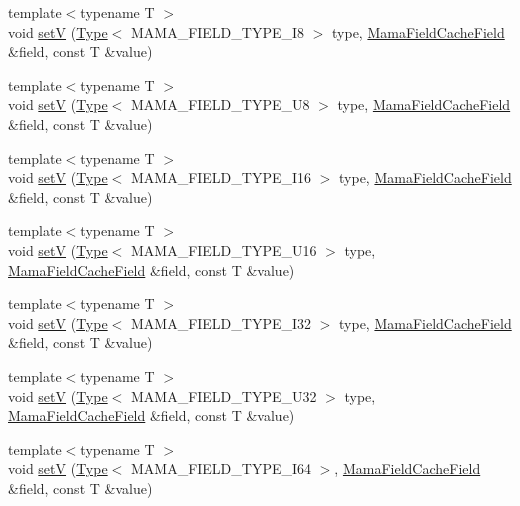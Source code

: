 \begin{DoxyCompactItemize}
\item 
{\footnotesize template$<$typename T $>$ }\\void \hyperlink{namespaceWombat_a85b9c6736a5030bfd03fc14f01869d86}{setV} (\hyperlink{classWombat_1_1Type}{Type}$<$ MAMA\_\-FIELD\_\-TYPE\_\-I8 $>$ type, \hyperlink{classWombat_1_1MamaFieldCacheField}{MamaFieldCacheField} \&field, const T \&value)
\item 
{\footnotesize template$<$typename T $>$ }\\void \hyperlink{namespaceWombat_a21353378eb961317cf15c2f48bc83b6a}{setV} (\hyperlink{classWombat_1_1Type}{Type}$<$ MAMA\_\-FIELD\_\-TYPE\_\-U8 $>$ type, \hyperlink{classWombat_1_1MamaFieldCacheField}{MamaFieldCacheField} \&field, const T \&value)
\item 
{\footnotesize template$<$typename T $>$ }\\void \hyperlink{namespaceWombat_a0bb174c4622f1745a15c8bfc94b7509b}{setV} (\hyperlink{classWombat_1_1Type}{Type}$<$ MAMA\_\-FIELD\_\-TYPE\_\-I16 $>$ type, \hyperlink{classWombat_1_1MamaFieldCacheField}{MamaFieldCacheField} \&field, const T \&value)
\item 
{\footnotesize template$<$typename T $>$ }\\void \hyperlink{namespaceWombat_a099b99c985108022be117de88751d717}{setV} (\hyperlink{classWombat_1_1Type}{Type}$<$ MAMA\_\-FIELD\_\-TYPE\_\-U16 $>$ type, \hyperlink{classWombat_1_1MamaFieldCacheField}{MamaFieldCacheField} \&field, const T \&value)
\item 
{\footnotesize template$<$typename T $>$ }\\void \hyperlink{namespaceWombat_a5cd88cd187fe6d270617d95635298caa}{setV} (\hyperlink{classWombat_1_1Type}{Type}$<$ MAMA\_\-FIELD\_\-TYPE\_\-I32 $>$ type, \hyperlink{classWombat_1_1MamaFieldCacheField}{MamaFieldCacheField} \&field, const T \&value)
\item 
{\footnotesize template$<$typename T $>$ }\\void \hyperlink{namespaceWombat_a2790b16dcc36f8a2bd67fd28656fca96}{setV} (\hyperlink{classWombat_1_1Type}{Type}$<$ MAMA\_\-FIELD\_\-TYPE\_\-U32 $>$ type, \hyperlink{classWombat_1_1MamaFieldCacheField}{MamaFieldCacheField} \&field, const T \&value)
\item 
{\footnotesize template$<$typename T $>$ }\\void \hyperlink{namespaceWombat_a0ff960f8e1e43ec81311b3a9c7659be7}{setV} (\hyperlink{classWombat_1_1Type}{Type}$<$ MAMA\_\-FIELD\_\-TYPE\_\-I64 $>$, \hyperlink{classWombat_1_1MamaFieldCacheField}{MamaFieldCacheField} \&field, const T \&value)

\end{DoxyCompactItemize}
